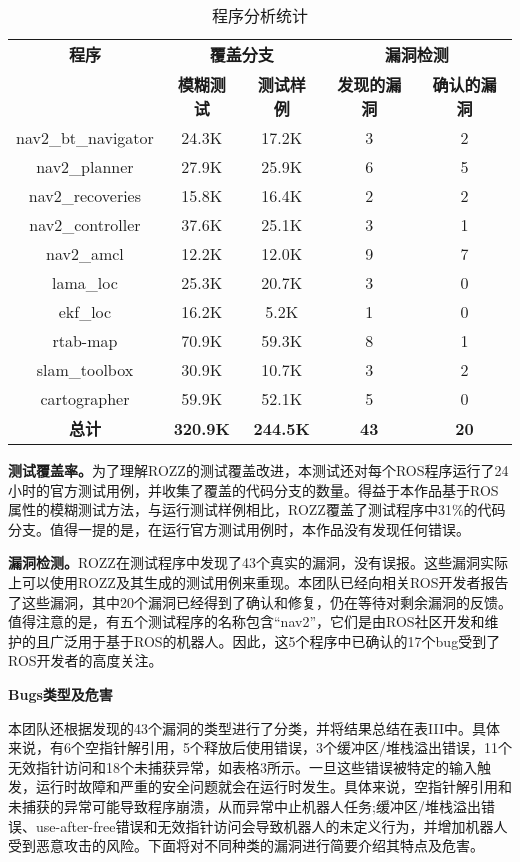 \begin{table}[H]
\small
\caption{程序分析统计}
\centering
\begin{tabular}{ccccc}
\hline
\textbf{程序} & \multicolumn{2}{c}{\textbf{覆盖分支}} & \multicolumn{2}{c}{\textbf{漏洞检测}} \\
\cline{2-5}
& \textbf{模糊测试} & \textbf{测试样例} & \textbf{发现的漏洞} & \textbf{确认的漏洞} \\
\hline
nav2\_bt\_navigator & 24.3K & 17.2K & 3 & 2 \\
nav2\_planner & 27.9K & 25.9K & 6 & 5 \\
nav2\_recoveries & 15.8K & 16.4K & 2 & 2 \\
nav2\_controller & 37.6K & 25.1K & 3 & 1 \\
nav2\_amcl & 12.2K & 12.0K & 9 & 7 \\
lama\_loc & 25.3K & 20.7K & 3 & 0 \\
ekf\_loc & 16.2K & 5.2K & 1 & 0 \\
rtab-map & 70.9K & 59.3K & 8 & 1 \\
slam\_toolbox & 30.9K & 10.7K & 3 & 2 \\
cartographer & 59.9K & 52.1K & 5 & 0 \\
\textbf{总计} & \textbf{320.9K} & \textbf{244.5K} & \textbf{43} & \textbf{20} \\
\hline
\end{tabular}
\end{table}


\textbf{测试覆盖率。}为了理解ROZZ的测试覆盖改进，本测试还对每个ROS程序运行了24小时的官方测试用例，并收集了覆盖的代码分支的数量。得益于本作品基于ROS属性的模糊测试方法，与运行测试样例相比，ROZZ覆盖了测试程序中31\%的代码分支。值得一提的是，在运行官方测试用例时，本作品没有发现任何错误。

\textbf{漏洞检测。}ROZZ在测试程序中发现了43个真实的漏洞，没有误报。这些漏洞实际上可以使用ROZZ及其生成的测试用例来重现。本团队已经向相关ROS开发者报告了这些漏洞，其中20个漏洞已经得到了确认和修复，仍在等待对剩余漏洞的反馈。值得注意的是，有五个测试程序的名称包含``nav2''，它们是由ROS社区开发和维护的且广泛用于基于ROS的机器人。因此，这5个程序中已确认的17个bug受到了ROS开发者的高度关注。

\textbf{Bugs类型及危害}

本团队还根据发现的43个漏洞的类型进行了分类，并将结果总结在表III中。具体来说，有6个空指针解引用，5个释放后使用错误，3个缓冲区/堆栈溢出错误，11个无效指针访问和18个未捕获异常，如表格3所示。一旦这些错误被特定的输入触发，运行时故障和严重的安全问题就会在运行时发生。具体来说，空指针解引用和未捕获的异常可能导致程序崩溃，从而异常中止机器人任务;缓冲区/堆栈溢出错误、use-after-free错误和无效指针访问会导致机器人的未定义行为，并增加机器人受到恶意攻击的风险。下面将对不同种类的漏洞进行简要介绍其特点及危害。


